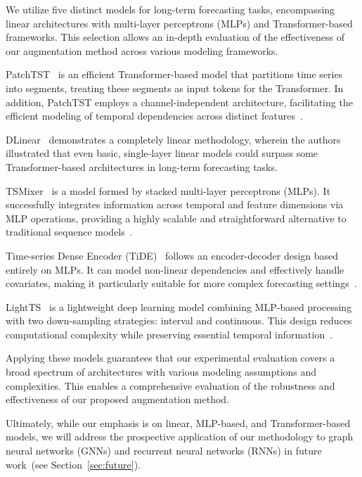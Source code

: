 We utilize five distinct models for long-term forecasting tasks, encompassing linear architectures with multi-layer perceptrons (MLPs) and Transformer-based frameworks. This selection allows an in-depth evaluation of the effectiveness of our augmentation method across various modeling frameworks.

PatchTST~\cite{nie2023timeseriesworth64} is an efficient Transformer-based model that partitions time series into segments, treating these segments as input tokens for the Transformer. In addition, PatchTST employs a channel-independent architecture, facilitating the efficient modeling of temporal dependencies across distinct features~\cite{nie2023timeseriesworth64}.

DLinear~\cite{zeng2022transformerseffectivetimeseries} demonstrates a completely linear methodology, wherein the authors illustrated that even basic, single-layer linear models could surpass some Transformer-based architectures in long-term forecasting tasks.

TSMixer~\cite{chen2023tsmixerallmlparchitecturetime} is a model formed by stacked multi-layer perceptrons (MLPs). It successfully integrates information across temporal and feature dimensions via MLP operations, providing a highly scalable and straightforward alternative to traditional sequence models~\cite{chen2023tsmixerallmlparchitecturetime}.

Time-series Dense Encoder (TiDE)~\cite{das2024longtermforecastingtidetimeseries} follows an encoder-decoder design based entirely on MLPs. It can model non-linear dependencies and effectively handle covariates, making it particularly suitable for more complex forecasting settings~\cite{das2024longtermforecastingtidetimeseries}.


LightTS~\cite{zhang2022morefastmultivariatetime} is a lightweight deep learning model combining MLP-based processing with two down-sampling strategies: interval and continuous. This design reduces computational complexity while preserving essential temporal information~\cite{zhang2022morefastmultivariatetime}.


Applying these models guarantees that our experimental evaluation covers a broad spectrum of architectures with various modeling assumptions and complexities. This enables a comprehensive evaluation of the robustness and effectiveness of our proposed augmentation method.


Ultimately, while our emphasis is on linear, MLP-based, and Transformer-based models, we will address the prospective application of our methodology to graph neural networks (GNNs) and recurrent neural networks (RNNs) in future work (see Section~\ref{sec:future}).

